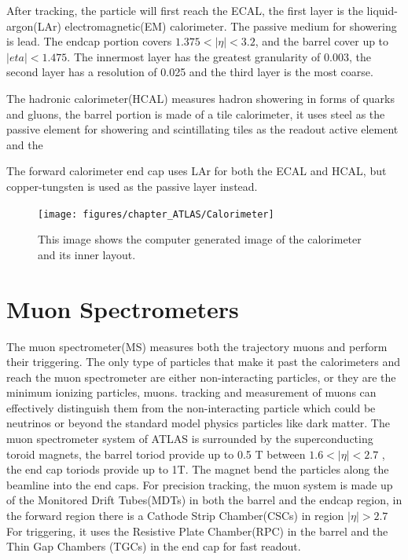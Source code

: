 After tracking, the particle will first reach the ECAL, the first layer is the liquid-argon(LAr) electromagnetic(EM) calorimeter. The passive medium for showering is lead. The endcap portion covers $1.375< |\eta| < 3.2$, and the barrel cover up to $|eta|<1.475$. The innermost layer has the greatest granularity of 0.003, the second layer has a resolution of 0.025 and the third layer is the most coarse. 

The hadronic calorimeter(HCAL) measures hadron showering in forms of quarks and gluons, the barrel portion is made of a tile calorimeter, it uses steel as the passive element for showering and scintillating tiles as the readout active element and the 

The forward calorimeter end cap uses LAr for both the ECAL and HCAL, but copper-tungsten is used as the passive layer instead. 


\begin{figure}[!htb]
    \begin{center}
        \texttt{[image: figures/chapter\_ATLAS/Calorimeter]}
        \caption{
		    This image shows the computer generated image of the calorimeter and its inner layout. \cite{Pequenao:1095927}
        }
        \label{fig:Calorimeter}
    \end{center}
\end{figure}

\section{Muon Spectrometers}
The muon spectrometer(MS) measures both the trajectory muons and perform their triggering. The only type of particles that make it past the calorimeters and reach the muon spectrometer are either non-interacting particles, or they are the minimum ionizing particles, muons. tracking and measurement of muons can effectively distinguish them from the non-interacting particle which could be neutrinos or beyond the standard model physics particles like dark matter. 
The muon spectrometer system of ATLAS is surrounded by the superconducting toroid magnets, the barrel toriod provide up to 0.5 T between $1.6 < |\eta|<2.7$ , the end cap toriods provide up to 1T. The magnet bend the particles along the beamline into the end caps.
For precision tracking, the muon system is made up of the Monitored Drift Tubes(MDTs) in both the barrel and the endcap region, in the forward region there is a Cathode Strip Chamber(CSCs) in region $|\eta|>2.7$
For triggering, it uses the Resistive Plate Chamber(RPC) in the barrel and the Thin Gap Chambers (TGCs) in the end cap for fast readout. 

